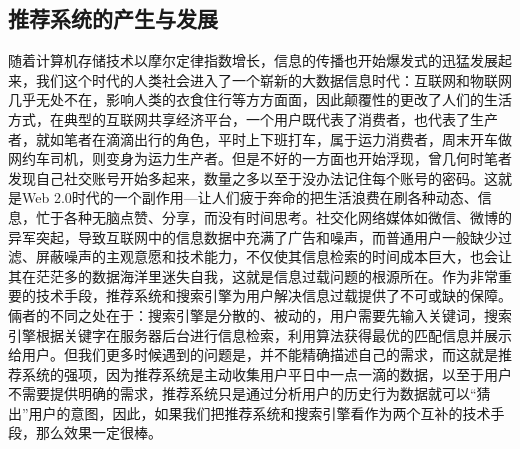	\subsection{推荐系统的产生与发展}
	随着计算机存储技术以摩尔定律指数增长，信息的传播也开始爆发式的迅猛发展起来，我们这个时代的人类社会进入了一个崭新的大数据信息时代：互联网和物联网几乎无处不在，影响人类的衣食住行等方方面面，因此颠覆性的更改了人们的生活方式，在典型的互联网共享经济平台，一个用户既代表了消费者，也代表了生产者，就如笔者在滴滴出行的角色，平时上下班打车，属于运力消费者，周末开车做网约车司机，则变身为运力生产者。但是不好的一方面也开始浮现，曾几何时笔者发现自己社交账号开始多起来，数量之多以至于没办法记住每个账号的密码。这就是Web 2.0时代的一个副作用---让人们疲于奔命的把生活浪费在刷各种动态、信息，忙于各种无脑点赞、分享，而没有时间思考。社交化网络媒体如微信、微博的异军突起，导致互联网中的信息数据中充满了广告和噪声，而普通用户一般缺少过滤、屏蔽噪声的主观意愿和技术能力，不仅使其信息检索的时间成本巨大，也会让其在茫茫多的数据海洋里迷失自我，这就是信息过载问题的根源所在\citep{info-overload, info-overload:1}。作为非常重要的技术手段，推荐系统和搜索引擎为用户解决信息过载提供了不可或缺的保障。倆者的不同之处在于：搜索引擎是分散的、被动的，用户需要先输入关键词，搜索引擎根据关键字在服务器后台进行信息检索，利用算法获得最优的匹配信息并展示给用户。但我们更多时候遇到的问题是，并不能精确描述自己的需求，而这就是推荐系统的强项，因为推荐系统是主动收集用户平日中一点一滴的数据，以至于用户不需要提供明确的需求，推荐系统只是通过分析用户的历史行为数据就可以“猜出”用户的意图，因此，如果我们把推荐系统和搜索引擎看作为两个互补的技术手段，那么效果一定很棒。

